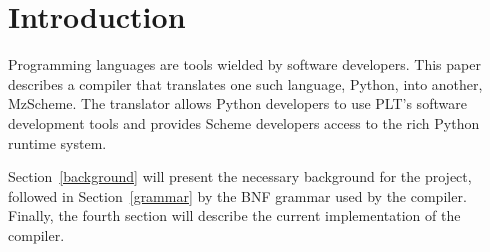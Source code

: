 
\section{Introduction}


Programming languages are tools wielded by software developers.  This paper describes a compiler that translates one such language, Python, into another, MzScheme.  The translator allows Python developers to use PLT's software development tools and provides Scheme developers access to the rich Python runtime system.

  Section~\ref{background} will present the necessary background for the project, followed in Section~\ref{grammar} by the BNF grammar used by the compiler.  Finally, the fourth section will describe the current implementation of the compiler.
